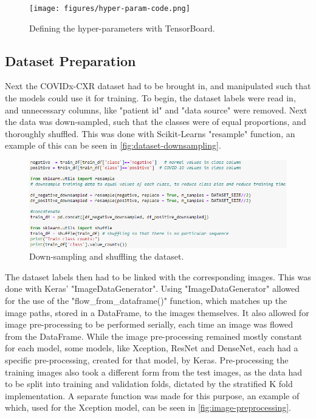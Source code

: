 \begin{figure}[H]
    \centering
    \texttt{[image: figures/hyper-param-code.png]}
    \caption{Defining the hyper-parameters with TensorBoard.}
    \label{fig:hyper-param-code}
\end{figure}

\subsection{Dataset Preparation}
Next the COVIDx-CXR dataset had to be brought in, and manipulated such that the models could use it for training. To begin, the dataset labels were read in, and unnecessary columns, like "patient id" and "data source" were removed. Next the data was down-sampled, such that the classes were of equal proportions, and thoroughly shuffled. This was done with Scikit-Learns "resample" function, an example of this can be seen in \autoref{fig:dataset-downsampling}. 

\begin{figure}[H]
    \centering
    \includegraphics[width=\textwidth]{figures/dataset-downsampling.png}
    \caption{Down-sampling and shuffling the dataset.}
    \label{fig:dataset-downsampling}
\end{figure}

The dataset labels then had to be linked with the corresponding images. This was done with Keras' "ImageDataGenerator". Using "ImageDataGenerator" allowed for the use of the "flow\_from\_dataframe()" function, which matches up the image paths, stored in a DataFrame, to the images themselves. It also allowed for image pre-processing to be performed serially, each time an image was flowed from the DataFrame. While the image pre-processing remained mostly constant for each model, some models, like Xception, ResNet and DenseNet, each had a specific pre-processing, created for that model, by Keras. Pre-processing the training images also took a different form from the test images, as the data had to be split into training and validation folds, dictated by the stratified K fold implementation. A separate function was made for this purpose, an example of which, used for the Xception model, can be seen in \autoref{fig:image-preprocessing}.

